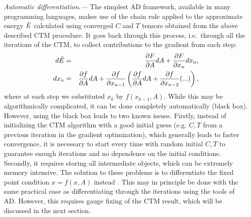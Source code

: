 \documentclass[twocolumn,floatfix,superscriptaddress,longbibliography,pra]{revtex4-2}
\renewcommand{\section}[1]{\emph{#1.---}}
\begin{document}
\section{Automatic differentiation}%
The simplest AD framework, available in many programming languages, makes use of the chain rule applied to the approximate energy $\Tilde{E}$ calculated using converged $C$ and $T$ tensors obtained from the above described CTM procedure. It goes back through this process, i.e.\ through all the iterations of the CTM, to collect contributions to the gradient from each step: 
\begin{eqnarray}
    d\Tilde{E} &=& \frac{\partial F}{\partial A} dA + \frac{\partial F}{\partial x_n} dx_n,   \label{eq:dE} \\
    dx_n &=&\frac{\partial f}{\partial A} dA + \frac{\partial f}{\partial x_{n-1}}\left(\frac{\partial f}{\partial A}dA + \frac{\partial f}{\partial x_{n-2}} (...)\right), \label{eq:dxn}
\end{eqnarray}
where at each step we substituted $x_k$ by $f(x_{k-1},A)$. While this may be algorithmically complicated, it can be done completely automatically (black box). However, using the black box leads to two known issues. Firstly, instead of initializing the CTM algorithm with a good initial guess (e.g. $C,T$ from a previous iteration in the gradient optimization), which generally leads to faster convergence, it is necessary to start every time with random initial $C,T$ to guarantee enough iterations and no dependence on the initial conditions. Secondly, it requires storing all intermediate objects, which can be extremely memory intensive. The solution to these problems is to differentiate the fixed point condition $x=f(x,A)$ instead \cite{AD_CTM,ImplicitFunction}. This may in principle be done with the same practical ease as differentiating through the iterations using the tools of AD. However, this requires gauge fixing of the CTM result, which will be discussed in the next section.  




\end{document}
